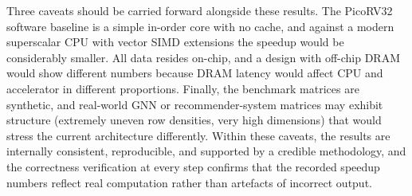 Three caveats should be carried forward alongside these results. The
PicoRV32 software baseline is a simple in-order core with no cache, and
against a modern superscalar CPU with vector SIMD extensions the
speedup would be considerably smaller. All data resides on-chip, and a
design with off-chip DRAM would show different numbers because DRAM
latency would affect CPU and accelerator in different proportions.
Finally, the benchmark matrices are synthetic, and real-world GNN or
recommender-system matrices may exhibit structure (extremely uneven row
densities, very high dimensions) that would stress the current
architecture differently. Within these caveats, the results are
internally consistent, reproducible, and supported by a credible
methodology, and the correctness verification at every step confirms
that the recorded speedup numbers reflect real computation rather than
artefacts of incorrect output.
